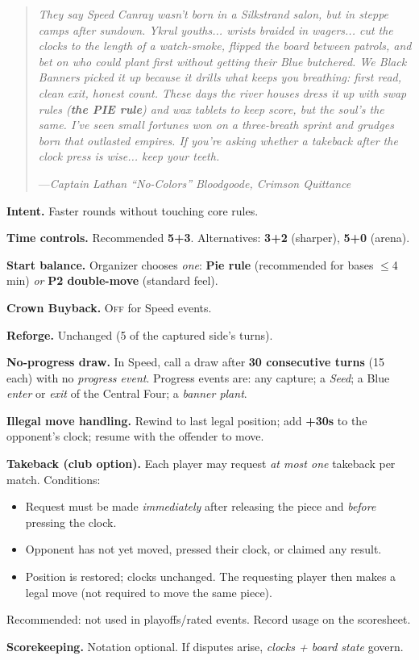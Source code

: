 \documentclass[11pt]{article}
\begin{document}
\begin{quote}\small\itshape
They say Speed Canray wasn’t born in a Silkstrand salon, but in steppe camps after sundown. 
Ykrul youths... wrists braided in wagers... cut the clocks to the length of a watch-smoke, 
flipped the board between patrols, and bet on who could plant first without getting their Blue butchered. 
We Black Banners picked it up because it drills what keeps you breathing: first read, clean exit, honest count. 
These days the river houses dress it up with swap rules (\textbf{the PIE rule}) and wax tablets to keep score, but the soul’s the same. 
I’ve seen small fortunes won on a three-breath sprint and grudges born that outlasted empires. 
If you’re asking whether a takeback after the clock press is wise... keep your teeth.

\hfill---\textit{Captain Lathan “No-Colors” Bloodgoode, \emph{Crimson Quittance}}
\end{quote}

\bigskip

\begin{rulevariant}[title={Speed Canray (Blitz Variant)}]
\small
\textbf{Intent.} Faster rounds without touching core rules.

\textbf{Time controls.} Recommended \textbf{5+3}. Alternatives: \textbf{3+2} (sharper), \textbf{5+0} (arena).

\textbf{Start balance.} Organizer chooses \emph{one}: \textbf{Pie rule} (recommended for bases $\le$4 min) \emph{or} \textbf{P2 double-move} (standard feel).

\textbf{Crown Buyback.} \textsc{Off} for Speed events.

\textbf{Reforge.} Unchanged (5 of the captured side’s turns).

\textbf{No-progress draw.} In Speed, call a draw after \textbf{30 consecutive turns} (15 each) with no \emph{progress event}. Progress events are: any capture; a \emph{Seed}; a Blue \emph{enter} or \emph{exit} of the Central Four; a \emph{banner plant}.

\textbf{Illegal move handling.} Rewind to last legal position; add \textbf{+30s} to the opponent’s clock; resume with the offender to move.

\textbf{Takeback (club option).} Each player may request \emph{at most one} takeback per match. Conditions:
\begin{itemize}\itemsep=0.2em
  \item Request must be made \emph{immediately} after releasing the piece and \emph{before} pressing the clock.
  \item Opponent has not yet moved, pressed their clock, or claimed any result.
  \item Position is restored; clocks unchanged. The requesting player then makes a legal move (not required to move the same piece).
\end{itemize}
Recommended: not used in playoffs/rated events. Record usage on the scoresheet.

\textbf{Scorekeeping.} Notation optional. If disputes arise, \emph{clocks + board state} govern.
\end{rulevariant}
\end{document}
